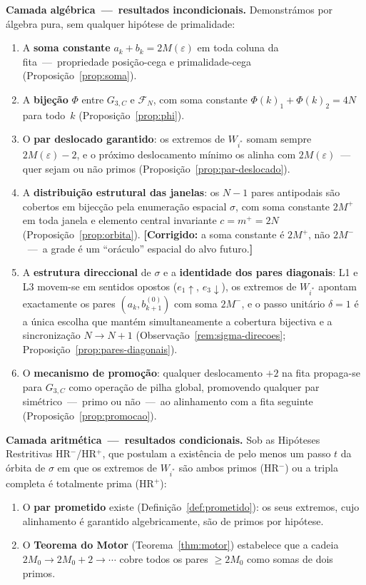 \documentclass[12pt, a4paper]{article}
\theoremstyle{plain}
\theoremstyle{definition}
\theoremstyle{remark}
\begin{document}
	\medskip
	\noindent\textbf{Camada algébrica~---~resultados incondicionais.}
	Demonstrámos por álgebra pura, sem qualquer hipótese de primalidade:
	\begin{enumerate}
		\item A \textbf{soma constante} $a_k+b_k=2M(\varepsilon)$ em
		toda coluna da fita~---~propriedade posição-cega e
		primalidade-cega (Proposição~\ref{prop:soma}).
		\item A \textbf{bijeção} $\Phi$ entre $G_{3,C}$ e
		$\mathcal{F}_N$, com soma constante $\Phi(k)_1+\Phi(k)_2
		=4N$ para todo~$k$ (Proposição~\ref{prop:phi}).
		\item O \textbf{par deslocado garantido}: os extremos de
		$W_{i^*}$ somam sempre $2M(\varepsilon)-2$, e o próximo
		deslocamento mínimo os alinha com $2M(\varepsilon)$~---~
		quer sejam ou não primos
		(Proposição~\ref{prop:par-deslocado}).
		\item A \textbf{distribuição estrutural das janelas}: os $N-1$
		pares antipodais são cobertos em bijecção pela enumeração
		espacial $\sigma$, com soma constante $2M^+$ em toda janela
		e elemento central invariante $c=m^+=2N$
		(Proposição~\ref{prop:orbita}).  \textbf{[Corrigido:} a soma
		constante é $2M^+$, não $2M^-$~---~a grade é um ``oráculo''
		espacial do alvo futuro.\textbf{]}
		\item A \textbf{estrutura direccional} de $\sigma$ e a
		\textbf{identidade dos pares diagonais}: L1 e L3
		movem-se em sentidos opostos ($e_1\!\uparrow$,
		$e_3\!\downarrow$), os extremos de $W_{i^*}$ apontam
		exactamente os pares $(a_k,b_{k+1}^{(0)})$ com soma
		$2M^-$, e o passo unitário $\delta=1$ é a única escolha
		que mantém simultaneamente a cobertura bijectiva e a
		sincronização $N\to N{+}1$
		(Observação~\ref{rem:sigma-direcoes};
		Proposição~\ref{prop:pares-diagonais}).
		\item O \textbf{mecanismo de promoção}: qualquer deslocamento
		$+2$ na fita propaga-se para $G_{3,C}$ como operação de
		pilha global, promovendo qualquer par simétrico~---~primo
		ou não~---~ao alinhamento com a fita seguinte
		(Proposição~\ref{prop:promocao}).
	\end{enumerate}
	
	\medskip
	\noindent\textbf{Camada aritmética~---~resultados condicionais.}
	Sob as Hipóteses Restritivas HR$^-$/HR$^+$, que postulam a
	existência de pelo menos um passo $t$ da órbita de $\sigma$ em que
	os extremos de $W_{i^*}$ são ambos primos (HR$^-$) ou a tripla
	completa é totalmente prima (HR$^+$):
	\begin{enumerate}
		\item O \textbf{par prometido} existe
		(Definição~\ref{def:prometido}): os seus extremos, cujo
		alinhamento é garantido algebricamente, são de primos por
		hipótese.
		\item O \textbf{Teorema do Motor}
		(Teorema~\ref{thm:motor}) estabelece que a cadeia
		$2M_0\to2M_0+2\to\cdots$ cobre todos os pares $\geq 2M_0$
		como somas de dois primos.
	\end{enumerate}
	
\end{document}
